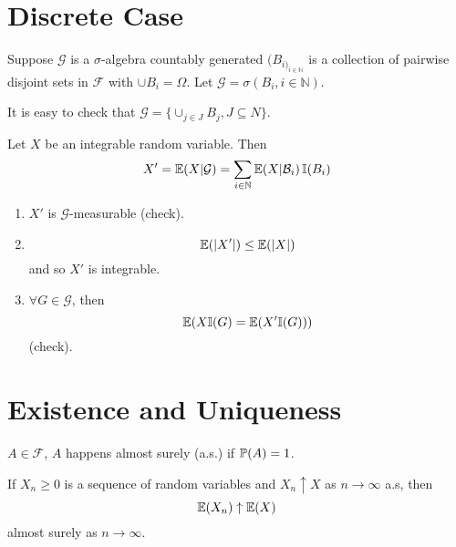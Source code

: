 \section{Discrete Case}
\label{sec:discrete-case}

Suppose $\mathcal{G}$ is a $\sigma$-algebra countably generated
$(B_{i)_{i \in \mathbb{N}}}$ is a collection of pairwise disjoint sets
in $\mathcal{F}$ with $\cup B_{i} = \Omega$. Let $\mathcal{G} =
\sigma(B_{i}, i \in \mathbb{N})$.

It is easy to check that $\mathcal{G} = \{ \cup_{j \in J} B_{j}, J
\subseteq {N} \}$.

Let $X$ be an integrable random variable.  Then
\begin{align*}
  X' = \E{X | \mathcal{G}} = \sum_{i \in \mathbb{N}}
  \E{X | \mathcal{B}_{i}} \I{B_{i}}
\end{align*}

\begin{enumerate}
\item $X'$ is $\mathcal{G}$-measurable (check).
\item
  \begin{equation}
    \label{eq:3}
    \E{|X'|} \leq \E{|X|}
  \end{equation} and so $X'$ is integrable.
\item $\forall G \in \mathcal{G}$, then
  \begin{equation}
    \label{eq:4}
    \E{X \I{G} = \E{X' \I{G}}}
  \end{equation} (check).
\end{enumerate}

\section{Existence and Uniqueness}
\label{sec:existence-uniqueness}

\begin{defn}
  \label{defn:8}
  $A \in \mathcal{F}$, $A$ happens almost surely (a.s.) if
  $\Prob{A} = 1$.
\end{defn}

\begin{thm}
  If $X_{n} \geq 0$ is a sequence of random variables and $X_{n}
  \uparrow X$ as $n \rightarrow \infty$ a.s, then
  \begin{equation}
    \label{eq:5}
    \E{X_{n}} \uparrow \E{X}
  \end{equation} almost surely as $n \rightarrow \infty$.
\end{thm}

